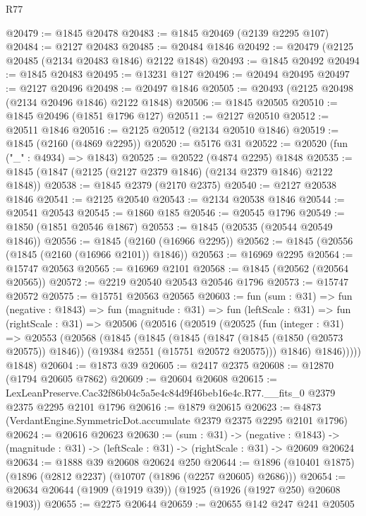 \begin{lexlean}{R77}
\begin{coremodule}
@20479 := @1845 @20478
@20483 := @1845 @20469 (@2139 @2295 @107)
@20484 := @2127 @20483
@20485 := @20484 @1846
@20492 := @20479 (@2125 @20485 (@2134 @20483 @1846) @2122 @1848)
@20493 := @1845 @20492
@20494 := @1845 @20483
@20495 := @13231 @127
@20496 := @20494 @20495
@20497 := @2127 @20496
@20498 := @20497 @1846
@20505 := @20493 (@2125 @20498 (@2134 @20496 @1846) @2122 @1848)
@20506 := @1845 @20505
@20510 := @1845 @20496 (@1851 @1796 @127)
@20511 := @2127 @20510
@20512 := @20511 @1846
@20516 := @2125 @20512 (@2134 @20510 @1846)
@20519 := @1845 (@2160 (@4869 @2295))
@20520 := @5176 @31
@20522 := @20520 (fun ("_" : @4934) => @1843)
@20525 := @20522 (@4874 @2295) @1848
@20535 := @1845 (@1847 (@2125 (@2127 @2379 @1846) (@2134 @2379 @1846) @2122 @1848))
@20538 := @1845 @2379 (@2170 @2375)
@20540 := @2127 @20538 @1846
@20541 := @2125 @20540
@20543 := @2134 @20538 @1846
@20544 := @20541 @20543
@20545 := @1860 @185
@20546 := @20545 @1796
@20549 := @1850 (@1851 @20546 @1867)
@20553 := @1845 (@20535 (@20544 @20549 @1846))
@20556 := @1845 (@2160 (@16966 @2295))
@20562 := @1845 (@20556 (@1845 (@2160 (@16966 @2101)) @1846))
@20563 := @16969 @2295
@20564 := @15747 @20563
@20565 := @16969 @2101
@20568 := @1845 (@20562 (@20564 @20565))
@20572 := @2219 @20540 @20543 @20546 @1796
@20573 := @15747 @20572
@20575 := @15751 @20563 @20565
@20603 := fun (sum : @31) =>
  fun (negative : @1843) =>
  fun (magnitude : @31) =>
  fun (leftScale : @31) =>
  fun (rightScale : @31) =>
  @20506
    (@20516
      (@20519
        (@20525
          (fun (integer : @31) =>
          @20553
            (@20568
              (@1845
                (@1845
                  (@1845
                    (@1847 (@1845 (@1850 (@20573 @20575)) @1846))
                    (@19384 @2551 (@15751 @20572 @20575)))
                  @1846)
                @1846)))))
      @1848)
@20604 := @1873 @39
@20605 := @2417 @2375
@20608 := @12870 (@1794 @20605 @7862)
@20609 := @20604 @20608
@20615 := LexLeanPreserve.Cac32f86b04c5a5e4c84d9f46beb16e4c.R77.__fits_0
    @2379
    @2375
    @2295
    @2101
    @1796
@20616 := @1879 @20615
@20623 := @4873 (VerdantEngine.SymmetricDot.accumulate @2379 @2375 @2295 @2101 @1796)
@20624 := @20616 @20623
@20630 := (sum : @31) ->
  (negative : @1843) ->
  (magnitude : @31) -> (leftScale : @31) -> (rightScale : @31) -> @20609 @20624
@20634 := @1888 @39 @20608 @20624 @250
@20644 := @1896 (@10401 @1875) (@1896 (@2812 @2237) (@10707 (@1896 (@2257 @20605) @2686)))
@20654 := @20634 @20644 (@1909 (@1919 @39)) (@1925 (@1926 (@1927 @250) @20608 @1903))
@20655 := @2275 @20644
@20659 := @20655 @142 @247 @241 @20505

\end{coremodule}
\end{lexlean}

